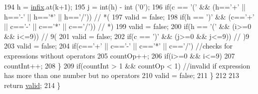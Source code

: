 \begin{DoxyCode}
194          h = \hyperlink{classAlgebraicExpression_ac9a5d8af4bd13370e7f2cb66b0f1daa2}{infix}.at(k+1);
195          j = int(h) - int (\textcolor{charliteral}{'0'});
196          \textcolor{keywordflow}{if}(c == \textcolor{charliteral}{'('} && (h==\textcolor{charliteral}{'+'} || h==\textcolor{charliteral}{'-'} || h==\textcolor{charliteral}{'*'} || h==\textcolor{charliteral}{'/'})) \textcolor{comment}{// *(                                      
                                                                                                       }
197             valid = \textcolor{keyword}{false};
198          \textcolor{keywordflow}{if}(h == \textcolor{charliteral}{')'} && (c==\textcolor{charliteral}{'+'} || c==\textcolor{charliteral}{'-'} || c==\textcolor{charliteral}{'*'} || c==\textcolor{charliteral}{'/'})) \textcolor{comment}{// *)                                      
                                                                                                       }
199             valid = \textcolor{keyword}{false};
200          \textcolor{keywordflow}{if}(h == \textcolor{charliteral}{'('} && (i>=0 && i<=9)) \textcolor{comment}{// 9(                                                              
                                                                                                       }
201             valid = \textcolor{keyword}{false};
202          \textcolor{keywordflow}{if}(c == \textcolor{charliteral}{')'} && (j>=0 && j<=9)) \textcolor{comment}{// )9                                                              
                                                                                                       }
203             valid = \textcolor{keyword}{false};
204          \textcolor{keywordflow}{if}(c==\textcolor{charliteral}{'+'} || c==\textcolor{charliteral}{'-'} || c==\textcolor{charliteral}{'*'} || c==\textcolor{charliteral}{'/'}) \textcolor{comment}{//checks for expressions without operators               
                                                                                                       }
205             countOp++;
206          \textcolor{keywordflow}{if}(i>=0 && i<=9)
207             countInt++;
208       \}
209       \textcolor{keywordflow}{if}(countInt > 1 && countOp < 1) \textcolor{comment}{//invalid if expression has more than one number but no operators    
                                                                                                       }
210          valid = \textcolor{keyword}{false};
211    \}
212 
213    \textcolor{keywordflow}{return} \hyperlink{classAlgebraicExpression_aa3c08af8a2b4d67c356f3cf69b2f6bc6}{valid};
214 \}
\end{DoxyCode}


